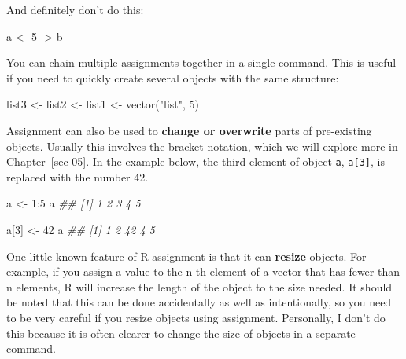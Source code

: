 \documentclass[
  13,
  letterpaper,
]{report}
\newenvironment{Shaded}{\begin{snugshade}}{\end{snugshade}}
\newcommand{\DecValTok}[1]{\textcolor[rgb]{0.68,0.00,0.00}{#1}}
\newcommand{\DocumentationTok}[1]{\textcolor[rgb]{0.37,0.37,0.37}{\textit{#1}}}
\newcommand{\FunctionTok}[1]{\textcolor[rgb]{0.28,0.35,0.67}{#1}}
\newcommand{\NormalTok}[1]{\textcolor[rgb]{0.00,0.23,0.31}{#1}}
\newcommand{\OtherTok}[1]{\textcolor[rgb]{0.00,0.23,0.31}{#1}}
\newcommand{\SpecialCharTok}[1]{\textcolor[rgb]{0.37,0.37,0.37}{#1}}
\newcommand{\StringTok}[1]{\textcolor[rgb]{0.13,0.47,0.30}{#1}}
\begin{document}
And definitely don't do this:

\begin{Shaded}
\begin{Highlighting}[]
\NormalTok{a }\OtherTok{\textless{}{-}} \DecValTok{5} \OtherTok{{-}\textgreater{}}\NormalTok{ b}
\end{Highlighting}
\end{Shaded}

You can chain multiple assignments together in a single command. This is
useful if you need to quickly create several objects with the same
structure:

\begin{Shaded}
\begin{Highlighting}[]
\NormalTok{list3 }\OtherTok{\textless{}{-}}\NormalTok{ list2 }\OtherTok{\textless{}{-}}\NormalTok{ list1 }\OtherTok{\textless{}{-}} \FunctionTok{vector}\NormalTok{(}\StringTok{"list"}\NormalTok{, }\DecValTok{5}\NormalTok{)}
\end{Highlighting}
\end{Shaded}

Assignment can also be used to \textbf{change or overwrite} parts of
pre-existing objects. Usually this involves the bracket notation, which
we will explore more in Chapter~\ref{sec-05}. In the example below, the
third element of object \texttt{a}, \texttt{a{[}3{]}}, is replaced with
the number 42.

\begin{Shaded}
\begin{Highlighting}[]
\NormalTok{a }\OtherTok{\textless{}{-}} \DecValTok{1}\SpecialCharTok{:}\DecValTok{5}
\NormalTok{a}
\DocumentationTok{\#\# [1] 1 2 3 4 5}

\NormalTok{a[}\DecValTok{3}\NormalTok{] }\OtherTok{\textless{}{-}} \DecValTok{42}
\NormalTok{a}
\DocumentationTok{\#\# [1]  1  2 42  4  5}
\end{Highlighting}
\end{Shaded}

One little-known feature of R assignment is that it can \textbf{resize}
objects. For example, if you assign a value to the n-th element of a
vector that has fewer than n elements, R will increase the length of the
object to the size needed. It should be noted that this can be done
accidentally as well as intentionally, so you need to be very careful if
you resize objects using assignment. Personally, I don't do this because
it is often clearer to change the size of objects in a separate command.
\end{document}
